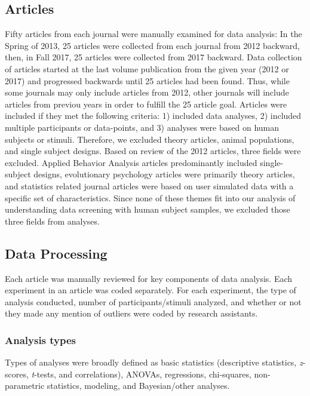 \documentclass[english,,man]{apa6}
\begin{document}
\hypertarget{articles}{%
\subsection{Articles}\label{articles}}

Fifty articles from each journal were manually examined for data analysis: In the Spring of 2013, 25 articles were collected from each journal from 2012 backward, then, in Fall 2017, 25 articles were collected from 2017 backward. Data collection of articles started at the last volume publication from the given year (2012 or 2017) and progressed backwards until 25 articles had been found. Thus, while some journals may only include articles from 2012, other journals will include articles from previou years in order to fulfill the 25 article goal. Articles were included if they met the following criteria: 1) included data analyses, 2) included multiple participants or data-points, and 3) analyses were based on human subjects or stimuli. Therefore, we excluded theory articles, animal populations, and single subject designs. Based on review of the 2012 articles, three fields were excluded. Applied Behavior Analysis articles predominantly included single-subject designs, evolutionary psychology articles were primarily theory articles, and statistics related journal articles were based on user simulated data with a specific set of characteristics. Since none of these themes fit into our analysis of understanding data screening with human subject samples, we excluded those three fields from analyses.

\hypertarget{data-processing}{%
\subsection{Data Processing}\label{data-processing}}

Each article was manually reviewed for key components of data analysis. Each experiment in an article was coded separately. For each experiment, the type of analysis conducted, number of participants/stimuli analyzed, and whether or not they made any mention of outliers were coded by research assistants.

\hypertarget{analysis-types}{%
\subsubsection{Analysis types}\label{analysis-types}}

Types of analyses were broadly defined as basic statistics (descriptive statistics, \emph{z}-scores, \emph{t}-tests, and correlations), ANOVAs, regressions, chi-squares, non-parametric statistics, modeling, and Bayesian/other analyses.
\end{document}

